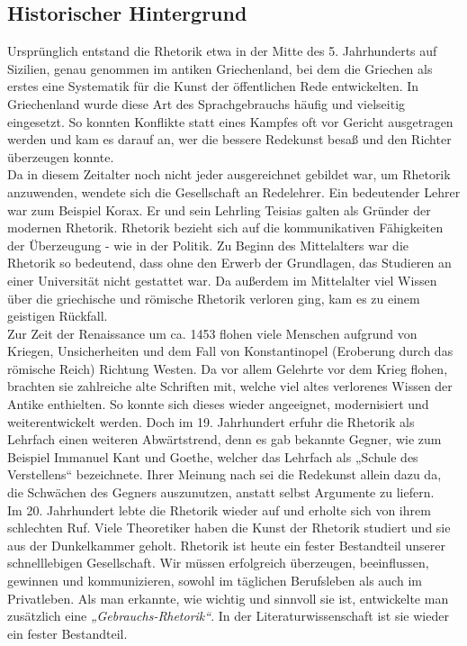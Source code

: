 \subsection{Historischer Hintergrund}
Ursprünglich entstand die Rhetorik etwa in der Mitte des 5. Jahrhunderts auf Sizilien, genau genommen im 
antiken Griechenland, bei dem die Griechen als erstes eine Systematik für die Kunst der öffentlichen 
Rede entwickelten. In Griechenland wurde diese Art des Sprachgebrauchs häufig und vielseitig eingesetzt. 
So konnten Konflikte statt eines Kampfes oft vor Gericht ausgetragen werden und kam es darauf an, wer die 
bessere Redekunst besaß und den Richter überzeugen konnte. \\Da in diesem Zeitalter noch nicht jeder 
ausgereichnet gebildet war, um Rhetorik anzuwenden, wendete sich die Gesellschaft an Redelehrer. Ein 
bedeutender Lehrer war zum Beispiel Korax. Er und sein Lehrling Teisias galten als Gründer der 
modernen Rhetorik. Rhetorik bezieht sich auf die kommunikativen Fähigkeiten der 
Überzeugung - wie in der Politik. Zu Beginn des Mittelalters war die Rhetorik so bedeutend, dass 
ohne den Erwerb der Grundlagen, das Studieren an einer Universität nicht gestattet war. Da außerdem 
im Mittelalter viel Wissen über die griechische und römische Rhetorik verloren ging, kam es zu einem 
geistigen Rückfall. \\Zur Zeit der Renaissance um ca. 1453 flohen viele Menschen aufgrund von Kriegen, 
Unsicherheiten und dem Fall von Konstantinopel (Eroberung durch das römische Reich) Richtung Westen. 
Da vor allem Gelehrte vor dem Krieg flohen, brachten sie zahlreiche alte Schriften mit, welche viel 
altes verlorenes Wissen der Antike enthielten. So konnte sich dieses wieder 
angeeignet, modernisiert und weiterentwickelt werden. Doch im 19. Jahrhundert erfuhr die Rhetorik als 
Lehrfach einen weiteren Abwärtstrend, denn es gab bekannte Gegner, wie zum Beispiel Immanuel Kant 
und Goethe, welcher das Lehrfach als „Schule des Verstellens“ bezeichnete. Ihrer Meinung nach sei die 
Redekunst allein dazu da, die Schwächen des Gegners auszunutzen, anstatt selbst Argumente zu liefern.  
\\Im 20. Jahrhundert lebte die Rhetorik wieder auf und erholte sich von ihrem schlechten Ruf. 
Viele Theoretiker haben die Kunst der Rhetorik studiert und sie aus der Dunkelkammer geholt. 
Rhetorik ist heute ein fester Bestandteil unserer schnelllebigen Gesellschaft. Wir müssen 
erfolgreich überzeugen, beeinflussen, gewinnen und kommunizieren, sowohl im täglichen Berufsleben 
als auch im Privatleben. Als man erkannte, wie wichtig und sinnvoll sie ist, entwickelte man 
zusätzlich eine \textit{„Gebrauchs-Rhetorik“}. In der Literaturwissenschaft ist sie wieder ein fester 
Bestandteil. 

